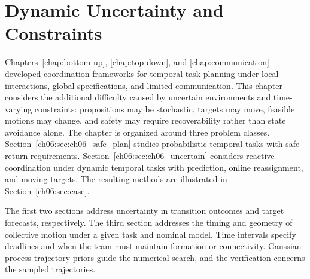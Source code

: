 \chapter{Dynamic Uncertainty and Constraints}
\label{chap:uncertainty}

Chapters~\ref{chap:bottom-up}, \ref{chap:top-down}, and
\ref{chap:communication} developed coordination frameworks for temporal-task
planning under local interactions, global specifications, and limited
communication. This chapter considers the additional difficulty caused by
uncertain environments and time-varying constraints: propositions may be
stochastic, targets may move, feasible motions may change, and safety may
require recoverability rather than state avoidance alone.
The chapter is organized around three problem classes.
Section~\ref{ch06:sec:ch06_safe_plan} studies probabilistic temporal tasks with
safe-return requirements. Section~\ref{ch06:sec:ch06_uncertain} considers
reactive coordination under dynamic temporal tasks with prediction, online
reassignment, and moving targets.  The resulting methods are illustrated in
Section~\ref{ch06:sec:case}.

\begin{revision}
The first two sections address uncertainty in transition outcomes and
target forecasts, respectively. The third section addresses the timing
and geometry of collective motion under a given task and nominal model.
Time intervals specify deadlines and when the team must maintain
formation or connectivity. Gaussian-process trajectory priors guide the
numerical search, and the verification concerns the sampled trajectories.
\end{revision}





